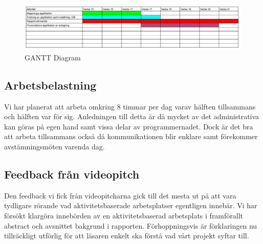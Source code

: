 \documentclass[swedish, a4paper,12pt]{article}
\begin{document}
\begin{figure}[h]
	\includegraphics[width=15cm]{media/GANTT.png}
	\caption{GANTT Diagram}
	\label{}
\end{figure}

\subsection{Arbetsbelastning}
Vi har planerat att arbeta omkring 8 timmar per dag varav hälften tillsammans och hälften var för sig. Anledningen till detta är då mycket av det administrativa kan göras på egen hand samt vissa delar av programmernadet. Dock är det bra att arbeta tillsammans också då kommunikationen blir enklare samt förekommer avstämningsmöten varenda dag.

\subsection{Feedback från videopitch}
Den feedback vi fick från videopitcharna gick till det mesta ut på att vara tydligare rörande vad aktivitetsbaserade arbetsplatser egentligen innebär.
Vi har försökt klargöra innebörden av en aktivitetsbaserad arbetsplats i framförallt abstract och avsnittet bakgrund i rapporten. Förhoppningsvis är förklaringen nu tillräckligt utförlig för att läsaren enkelt ska förstå vad vårt projekt syftar till.
\end{document}
